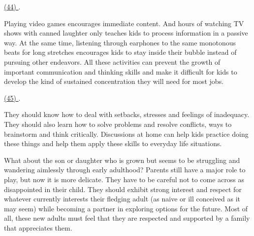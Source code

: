 \qquad \ul{(44) \qquad\qquad}.

\qquad Playing video games encourages immediate content. And hours of watching TV shows with canned laughter only teaches kids to process information in a passive way. At the same time, listening through earphones to the same monotonous beats for long stretches encourages kids to stay inside their bubble instead of pursuing other endeavors. All these activities can prevent the growth of important communication and thinking skills and make it difficult for kids to develop the kind of sustained concentration they will need for most jobs.

\qquad \ul{(45) \qquad\qquad}.

\qquad They should know how to deal with setbacks, stresses and feelings of inadequacy. They should also learn how to solve problems and resolve conflicts, ways to brainstorm and think critically. Discussions at home can help kids practice doing these things and help them apply these skills to everyday life situations.

\qquad What about the son or daughter who is grown but seems to be struggling and wandering aimlessly through early adulthood? Parents still have a major role to play, but now it is more delicate. They have to be careful not to come across as disappointed in their child. They should exhibit strong interest and respect for whatever currently interests their fledging adult (as naive or ill conceived as it may seem) while becoming a partner in exploring options for the future. Most of all, these new adults must feel that they are respected and supported by a family that appreciates them.
